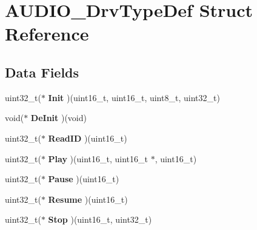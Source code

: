 \hypertarget{struct_a_u_d_i_o___drv_type_def}{}\section{A\+U\+D\+I\+O\+\_\+\+Drv\+Type\+Def Struct Reference}
\label{struct_a_u_d_i_o___drv_type_def}
\subsection*{Data Fields}
\begin{DoxyCompactItemize}
\item 
\mbox{\label{struct_a_u_d_i_o___drv_type_def_a4998954dbaf3bee970383bfbf7a32636}} 
uint32\+\_\+t($\ast$ {\bfseries Init} )(uint16\+\_\+t, uint16\+\_\+t, uint8\+\_\+t, uint32\+\_\+t)
\item 
\mbox{\label{struct_a_u_d_i_o___drv_type_def_a1b4189f6f6cf3c9af24f89cc70cd6fcf}} 
void($\ast$ {\bfseries De\+Init} )(void)
\item 
\mbox{\label{struct_a_u_d_i_o___drv_type_def_a9cc9d0e24a9a43655d9a784518d998a2}} 
uint32\+\_\+t($\ast$ {\bfseries Read\+ID} )(uint16\+\_\+t)
\item 
\mbox{\label{struct_a_u_d_i_o___drv_type_def_aaf08783572f1aee52f1fb936213534b0}} 
uint32\+\_\+t($\ast$ {\bfseries Play} )(uint16\+\_\+t, uint16\+\_\+t $\ast$, uint16\+\_\+t)
\item 
\mbox{\label{struct_a_u_d_i_o___drv_type_def_ade4f9e3739bb7a107f5d8a84a1c62fbe}} 
uint32\+\_\+t($\ast$ {\bfseries Pause} )(uint16\+\_\+t)
\item 
\mbox{\label{struct_a_u_d_i_o___drv_type_def_ab18ab060f3f2d9ef4575aed502b33a54}} 
uint32\+\_\+t($\ast$ {\bfseries Resume} )(uint16\+\_\+t)
\item 
\mbox{\label{struct_a_u_d_i_o___drv_type_def_aed402695769bf12578979071a0c3d85b}} 
uint32\+\_\+t($\ast$ {\bfseries Stop} )(uint16\+\_\+t, uint32\+\_\+t)
\item 

\end{DoxyCompactItemize}
